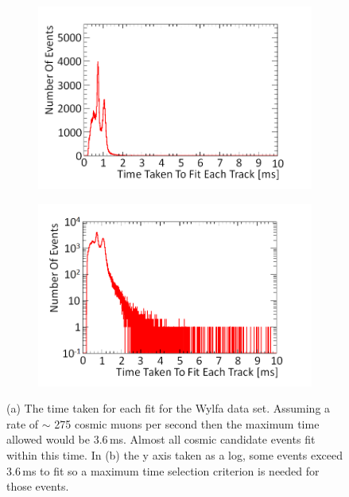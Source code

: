 \begin{figure}[!h]
\centering
\begin{subfigure}{.5\textwidth}
  \centering
  \includegraphics[width=\linewidth]{Chapter6/Figs/Raster/wylfaTrackerTimeMedText.png}
  \captionsetup{width=.9\linewidth}
  \caption{}
  \label{subFig:wylfaTrackerTime}
\end{subfigure}%
\begin{subfigure}{.5\textwidth}
  \centering
\includegraphics[width=\linewidth]{Chapter6/Figs/Raster/wylfaTrackerTimeLogMedText.png}
  \captionsetup{width=.9\linewidth}
  \caption{}
  \label{subFig:wylfaTrackerTimeLog}
\end{subfigure}
\caption[The time taken for each fit for the Wylfa data set.]{(a) The time taken for each fit for the Wylfa data set. Assuming a rate of $\sim$ 275 cosmic muons per second then the maximum time allowed would be 3.6\,ms. Almost all cosmic candidate events fit within this time. In (b) the y axis taken as a log, some events exceed 3.6\,ms to fit so a maximum time selection criterion is needed for those events.}
\label{fig:wylfaTrackerTimeAndLog}
\end{figure}

